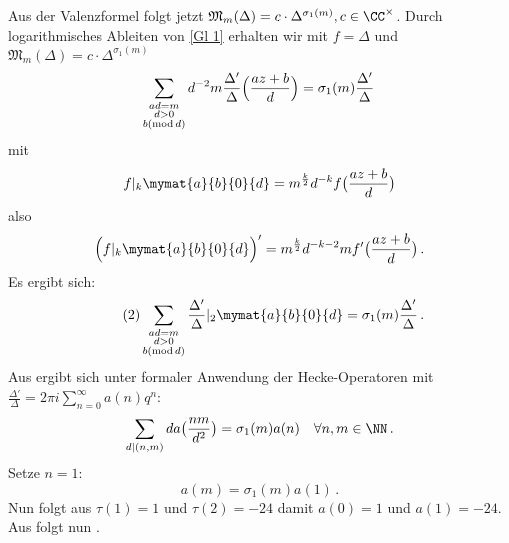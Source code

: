 \begin{bewe}
Aus der Valenzformel folgt jetzt $\mathfrak{M}_m(\Delta) = c \cdot \Delta^{\sigma_1(m)}, c \in \CC^\times$. Durch logarithmisches Ableiten von \autoref{Gl 1} erhalten wir mit $f  = \Delta$ und $\mathfrak{M}_m(\Delta) = c \cdot \Delta^{\sigma_1(m)}$
\[
\sum_{\substack{ad = m\\ d > 0\\
b (\operatorname{mod} d)}} d^{-2}m \frac{\Delta'}{\Delta} \Bigl( \frac{az+b}{d} \Bigr) = \sigma_1(m) \frac {\Delta'}{\Delta}
\,
\]
mit
\[
f |_k \mymat{a}{b}{0}{d} = m^{\frac k2} d^{-k} f\bigl( \frac{az+b}{d} \bigr)
\]
also
\[
\Bigl(f |_k \mymat{a}{b}{0}{d}\Bigr)' = m^{\frac k2} d^{-k-2} m f'\bigl( \frac{az+b}{d} \bigr)
\,.
\]
Es ergibt sich:
\[
\tag{2}
\sum_{\substack{ad = m\\ d > 0\\
b (\operatorname{mod} d)}} \frac{\Delta'}{\Delta} |_2 \mymat{a}{b}{0}{d} = \sigma_1(m) \frac{\Delta'}{\Delta}
\,.
\]
Aus  ergibt sich unter formaler Anwendung der Hecke-Operatoren mit $\frac{\Delta'}{\Delta} = 2\pi i \sum_{n=0}^\infty a(n) q^n$:
\[
\sum_{d\vert(n,m)} d a\bigl( \frac{nm}{d^2} \bigr) = \sigma_1(m) a(n) \quad \forall n,m \in \NN
\,.
\]
Setze $n = 1$: 
\[
\tag{3}
a(m) = \sigma_1(m) a(1)
\,.
\]
Nun folgt aus $\tau(1) = 1$ und $\tau(2) = -24$ damit $a(0) = 1$ und $a(1) = -24$. Aus  folgt nun \myref{(*)}.
\end{bewe}




